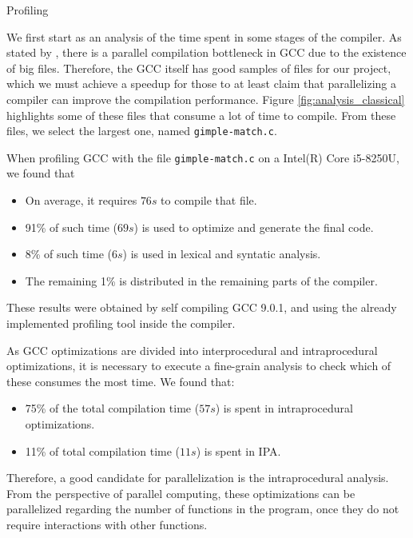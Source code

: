 \begin{section}{Profiling}\label{sec:profile}

We first start as an analysis of the time spent in some stages of the compiler.
As stated by \cite{PR84402}, there is a parallel compilation bottleneck in GCC
due to the existence of big files. Therefore, the GCC itself has good samples
of files for our project, which we must achieve a speedup for those to at least
claim that parallelizing a compiler can improve the compilation performance.
Figure \ref{fig:analysis_classical} highlights some of these files that consume
a lot of time to compile. From these files, we select the largest one, named
\texttt{gimple-match.c}.

When profiling GCC with the file \texttt{gimple-match.c} on a Intel(R) Core
i5-8250U, we found that
\begin{itemize}
    \item On average, it requires $76s$ to compile that file.

    \item 91\% of such time ($69s$) is used to optimize and generate the final code.

    \item 8\% of such time ($6s$) is used in lexical and syntatic analysis.

    \item The remaining 1\% is distributed in the remaining parts of the compiler.
\end{itemize}

These results were obtained by self compiling GCC 9.0.1, and using the already
implemented profiling tool inside the compiler.

As GCC optimizations are divided into interprocedural and intraprocedural
optimizations, it is necessary to execute a fine-grain analysis to check which
of these consumes the most time. We found that:
\begin{itemize}
	\item 75\% of the total compilation time ($57s$) is spent in intraprocedural
	optimizations.

	\item 11\% of total compilation time ($11s$) is spent in IPA.
\end{itemize}

Therefore, a good candidate for parallelization is the intraprocedural
analysis. From the perspective of parallel computing, these optimizations can
be parallelized regarding the number of functions in the program, once they do
not require interactions with other functions.


\end{section}
